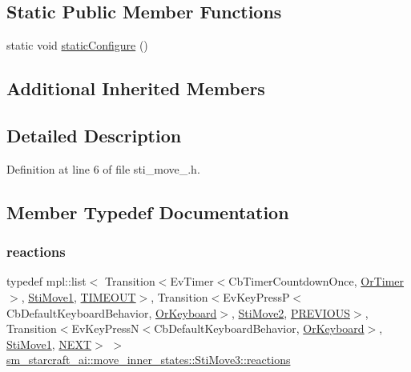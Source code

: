 \subsection*{Static Public Member Functions}
\begin{DoxyCompactItemize}
\item 
static void \hyperlink{structsm__starcraft__ai_1_1move__inner__states_1_1StiMove3_a40a677f56bfc7db23de87d05ef8f39bf}{static\+Configure} ()
\end{DoxyCompactItemize}
\subsection*{Additional Inherited Members}


\subsection{Detailed Description}


Definition at line 6 of file sti\+\_\+move\+\_.\+h.



\subsection{Member Typedef Documentation}
\mbox{\label{structsm__starcraft__ai_1_1move__inner__states_1_1StiMove3_a80a8cb4c25b8e2a44e50da48373cb72c}} 
\subsubsection{\texorpdfstring{reactions}{reactions}}
{\footnotesize\ttfamily typedef mpl\+::list$<$ Transition$<$Ev\+Timer$<$Cb\+Timer\+Countdown\+Once, \hyperlink{classsm__starcraft__ai_1_1OrTimer}{Or\+Timer}$>$, \hyperlink{structsm__starcraft__ai_1_1move__inner__states_1_1StiMove1}{Sti\+Move1}, \hyperlink{structsm__starcraft__ai_1_1move__inner__states_1_1StiMove3_1_1TIMEOUT}{T\+I\+M\+E\+O\+UT}$>$, Transition$<$Ev\+Key\+PressP$<$Cb\+Default\+Keyboard\+Behavior, \hyperlink{classsm__starcraft__ai_1_1OrKeyboard}{Or\+Keyboard}$>$, \hyperlink{structsm__starcraft__ai_1_1move__inner__states_1_1StiMove2}{Sti\+Move2}, \hyperlink{structsm__starcraft__ai_1_1move__inner__states_1_1StiMove3_1_1PREVIOUS}{P\+R\+E\+V\+I\+O\+US}$>$, Transition$<$Ev\+Key\+PressN$<$Cb\+Default\+Keyboard\+Behavior, \hyperlink{classsm__starcraft__ai_1_1OrKeyboard}{Or\+Keyboard}$>$, \hyperlink{structsm__starcraft__ai_1_1move__inner__states_1_1StiMove1}{Sti\+Move1}, \hyperlink{structsm__starcraft__ai_1_1move__inner__states_1_1StiMove3_1_1NEXT}{N\+E\+XT}$>$ $>$ \hyperlink{structsm__starcraft__ai_1_1move__inner__states_1_1StiMove3_a80a8cb4c25b8e2a44e50da48373cb72c}{sm\+\_\+starcraft\+\_\+ai\+::move\+\_\+inner\+\_\+states\+::\+Sti\+Move3\+::reactions}}



